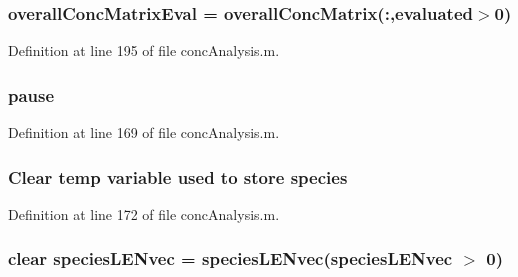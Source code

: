 \hypertarget{a00019_ad9fb43d1f2f660ac0e99cc638e5ac774}{
\subsubsection[{overall\-Conc\-Matrix\-Eval}]{\setlength{\rightskip}{0pt plus 5cm}overall\-Conc\-Matrix\-Eval = {\bf overall\-Conc\-Matrix}(\-:,{\bf evaluated}$>$0)}}\label{a00019_ad9fb43d1f2f660ac0e99cc638e5ac774}


Definition at line 195 of file conc\-Analysis.\-m.

\hypertarget{a00019_afd7d49e17b69bd6bf3d7a649856c1067}{
\subsubsection[{pause}]{\setlength{\rightskip}{0pt plus 5cm}pause}}\label{a00019_afd7d49e17b69bd6bf3d7a649856c1067}


Definition at line 169 of file conc\-Analysis.\-m.

\hypertarget{a00019_a0e465545a27eaf9ca2c9710f744963c4}{
\subsubsection[{species}]{\setlength{\rightskip}{0pt plus 5cm}Clear temp variable used {\bf to} store {\bf species}}}\label{a00019_a0e465545a27eaf9ca2c9710f744963c4}


Definition at line 172 of file conc\-Analysis.\-m.

\hypertarget{a00019_a728fdfd72d1bd5110134afd6e09e99da}{
\subsubsection[{species\-L\-E\-Nvec}]{\setlength{\rightskip}{0pt plus 5cm}clear species\-L\-E\-Nvec = species\-L\-E\-Nvec(species\-L\-E\-Nvec $>$ 0)}}\label{a00019_a728fdfd72d1bd5110134afd6e09e99da}


